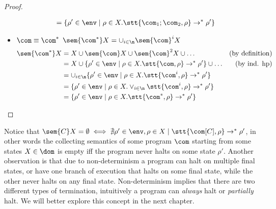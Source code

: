 \begin{proof}
\begin{itemize}
\begin{align*}
      & = \{\rho' \in\env \mid \rho \in X . \stt{\com_1;\com_2, \rho} \to^* \rho'\}
    \end{align*}
  \item \(\com \equiv \com^*\) \newline
    \(\sem{\com^*}X = \cup_{i\in\n}\sem{\com}^i X\)
    \begin{align*}
      \sem{\com^*}X & = X \cup \sem{\com}X \cup \sem{\com}^2X \cup \dots & \text{(by definition)}\\
      & = X \cup \{\rho' \in\env \mid \rho \in X . \stt{\com,\rho} \to^* \rho'\} \cup %
      \dots & \text{(by ind. hp)}\\
      & = \cup_{i\in\n} \{\rho' \in\env \mid \rho \in X . \stt{\com^i, \rho} \to^*  \rho'\} \\
      & = \{\rho' \in\env \mid \rho \in X . \vee_{i\in\n} \stt{\com^i, \rho} \to^* \rho'\} \\
      & = \{\rho' \in\env \mid \rho \in X . \stt{\com^*, \rho} \to^* \rho'\}
    \end{align*} \qedhere
  \end{itemize}
\end{proof}

Notice that
\(\sem{C}X = \emptyset \iff \nexists \rho'\in\env, \rho \in X \mid
\stt{\com[C],\rho} \to^* \rho'\), in other words the collecting
semantics of some program \(\com\) starting from some states
\(X\in\dom\) is empty iff the program never halts on some state
\(\rho'\). Another observation is that due to non-determinism a
program can halt on multiple final states, or have one branch of
execution that halts on some final state, while the other never halts
on any final state. Non-determinism implies that there are two
different types of termination, intuitively a program can
\emph{always} halt or \emph{partially} halt. We will better explore
this concept in the next chapter.
